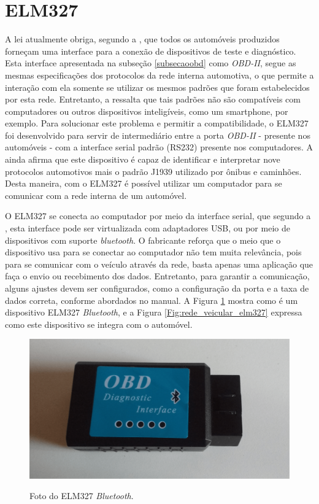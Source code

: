 \section{ELM327}
A lei atualmente obriga, segundo a , que todos os automóveis produzidos forneçam uma interface para a conexão de dispositivos de teste e diagnóstico. Esta interface apresentada na subseção \ref{subsecaoobd} como \textit{OBD-II}, segue as mesmas especificações dos protocolos da rede interna automotiva, o que permite a interação com ela somente se utilizar os mesmos padrões que foram estabelecidos por esta rede. Entretanto, a  ressalta que tais padrões não são compatíveis com computadores ou outros dispositivos inteligíveis, como um smartphone, por exemplo. Para solucionar este problema e permitir a compatibilidade, o ELM327 foi desenvolvido para servir de intermediário entre a porta \textit{OBD-II} - presente nos automóveis - com a interface serial padrão (RS232) presente nos computadores. A  ainda afirma que este dispositivo é capaz de identificar e interpretar nove protocolos automotivos mais o padrão J1939 utilizado por ônibus e caminhões. Desta maneira, com o ELM327 é possível utilizar um computador para se comunicar com a rede interna de um automóvel.

O ELM327 se conecta ao computador por meio da interface serial, que segundo a , esta interface pode ser virtualizada com adaptadores USB, ou por meio de dispositivos com suporte \textit{bluetooth}. O fabricante reforça que o meio que o dispositivo usa para se conectar ao computador não tem muita relevância, pois para se comunicar com o veículo através da rede, basta apenas uma aplicação que faça o envio ou recebimento dos dados. Entretanto, para garantir a comunicação, alguns ajustes devem ser configurados, como a configuração da porta e a taxa de dados correta, conforme abordados no manual. A Figura \ref{Fig:elm327} mostra como é um dispositivo ELM327 \textit{Bluetooth}, e a Figura \ref{Fig:rede_veicular_elm327} expressa como este dispositivo se integra com o automóvel.

\begin{figure}[!ht]
\centering
\caption{Foto do ELM327 \textit{Bluetooth}.} 
{\includegraphics[scale=.16]{imagens/elm327-min.png}}\\
 \label{Fig:elm327}
\end{figure}

